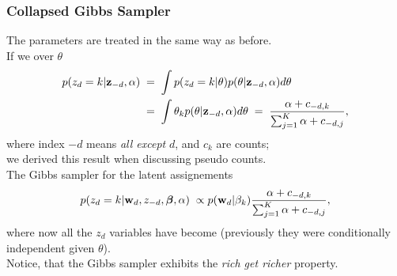 \begin{frame}
\frametitle{Collapsed Gibbs Sampler}

The parameters are treated in the same way as before.\\[1ex]

If we  over $\theta$
\[
\begin{split}  
  p(z_d=k|{\bf z}_{-d},\alpha)\;&=\;
  \int p(z_d=k|\theta)p(\theta|{\bf z}_{-d},\alpha)d\theta\\
&=\;\int \theta_k p(\theta|{\bf z}_{-d},\alpha)d\theta\;=\;
\frac{\alpha+c_{-d,k}}{\sum_{j=1}^K\alpha+c_{-d,j}},
\end{split}
\]
where index $-d$ means \emph{all except} $d$, and $c_k$ are counts;\\
we derived this result when discussing pseudo counts.\\[1ex]

The  Gibbs sampler for the latent assignements
\[
p(z_d=k|{\bf w}_d,z_{-d},\boldsymbol\beta,\alpha)\;\propto
p({\bf w}_d|\beta_k)\frac{\alpha+c_{-d,k}}{\sum_{j=1}^K\alpha+c_{-d,j}},
\]
where now all the $z_d$ variables have become  (previously
they were conditionally independent given $\theta$).\\[1ex]

Notice, that the Gibbs sampler exhibits the \emph{rich get richer} property.
\end{frame}

